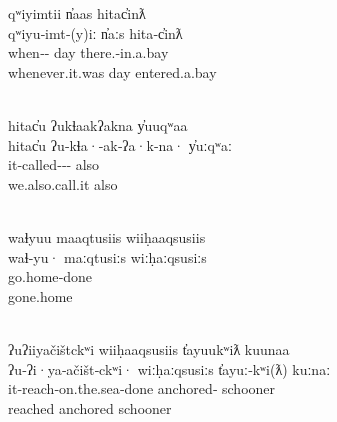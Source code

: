 \begin{exe}
  \glllll qʷiyimtii         n̓aas hitac̓inƛ\\
          qʷiyu‑imt‑(y)iː             n̓aːs           hita‑c̓inƛ\\
          when‑‑ day            there.‑in.a.bay\\
          whenever.it.was             day            entered.a.bay\\
          { }                                \\
          \vfix

  \glllll hitac̓u ʔukɬaakʔakna                y̓uuqʷaa\\
          hitac̓u           ʔu‑kɬa·‑ak‑ʔa·k‑na·                   y̓uːqʷaː\\
                  it‑called‑‑‑ also\\
                  we.also.call.it                       also\\
          { }                                           \\
          \vfix

  \glllll waɬyuu maaqtusiis wiiḥaaqsusiis\\
          waɬ‑yu·          maːqtusiːs           wiːḥaːqsusiːs\\
          go.home‑done                 \\
          gone.home                    \\
                               { }\\
          \vfix

  \glllll ʔuʔiiyačištckʷi wiiḥaaqsusiis t̓ayuukʷiƛ kuunaa\\
          ʔu‑ʔi·ya‑ačišt‑ckʷi·      wiːḥaːqsusiːs           t̓ayuː‑kʷi(ƛ)        kuːnaː\\
          it‑reach‑on.the.sea‑done                 anchored‑   schooner\\
          reached                                  anchored            schooner\\
                                                      \\
          \vfix


\end{exe}
